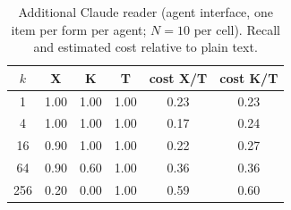 \begin{table}[!htbp]
\centering\small\setlength{\tabcolsep}{4pt}
\caption{Additional Claude reader (agent interface, one item per form per agent; $N{=}10$ per cell). Recall and estimated cost relative to plain text.}
\label{tab:app_claude}
\begin{tabular}{c ccc cc}
\toprule
$k$ & X & K & T & cost X/T & cost K/T \\
\midrule
1 & 1.00 & 1.00 & 1.00 & 0.23 & 0.23 \\
4 & 1.00 & 1.00 & 1.00 & 0.17 & 0.24 \\
16 & 0.90 & 1.00 & 1.00 & 0.22 & 0.27 \\
64 & 0.90 & 0.60 & 1.00 & 0.36 & 0.36 \\
256 & 0.20 & 0.00 & 1.00 & 0.59 & 0.60 \\
\bottomrule
\end{tabular}
\end{table}
